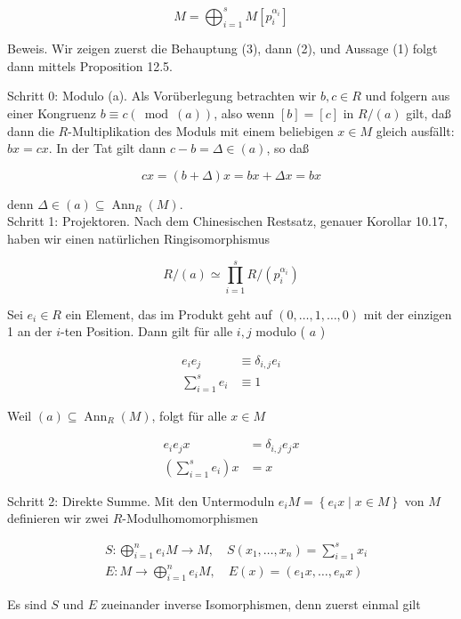 \documentclass[10pt, letterpaper]{article}
\begin{document}
$$
M=\bigoplus_{i=1}^{s} M\left[p_{i}^{\alpha_{i}}\right]
$$

Beweis. Wir zeigen zuerst die Behauptung (3), dann (2), und Aussage (1) folgt dann mittels Proposition 12.5.

Schritt 0: Modulo (a). Als Vorüberlegung betrachten wir $b, c \in R$ und folgern aus einer Kongruenz $b \equiv c(\bmod (a))$, also wenn $[b]=[c]$ in $R /(a)$ gilt, daß dann die $R$-Multiplikation des Moduls mit einem beliebigen $x \in M$ gleich ausfällt: $b x=c x$. In der Tat gilt dann $c-b=\Delta \in(a)$, so daß

$$
c x=(b+\Delta) x=b x+\Delta x=b x
$$

denn $\Delta \in(a) \subseteq \operatorname{Ann}_{R}(M)$.\\
Schritt 1: Projektoren. Nach dem Chinesischen Restsatz, genauer Korollar 10.17, haben wir einen natürlichen Ringisomorphismus

$$
R /(a) \simeq \prod_{i=1}^{s} R /\left(p_{i}^{\alpha_{i}}\right)
$$

Sei $e_{i} \in R$ ein Element, das im Produkt geht auf $(0, \ldots, 1, \ldots, 0)$ mit der einzigen 1 an der $i$-ten Position. Dann gilt für alle $i, j$ modulo ( $a$ )

$$
\begin{aligned}
e_{i} e_{j} & \equiv \delta_{i, j} e_{i} \\
\sum_{i=1}^{s} e_{i} & \equiv 1
\end{aligned}
$$

Weil $(a) \subseteq \operatorname{Ann}_{R}(M)$, folgt für alle $x \in M$

$$
\begin{aligned}
e_{i} e_{j} x & =\delta_{i, j} e_{j} x \\
\left(\sum_{i=1}^{s} e_{i}\right) x & =x
\end{aligned}
$$

Schritt 2: Direkte Summe. Mit den Untermoduln $e_{i} M=\left\{e_{i} x \mid x \in M\right\}$ von $M$ definieren wir zwei $R$-Modulhomomorphismen

$$
\begin{aligned}
& S: \bigoplus_{i=1}^{n} e_{i} M \rightarrow M, \quad S\left(x_{1}, \ldots, x_{n}\right)=\sum_{i=1}^{s} x_{i} \\
& E: M \rightarrow \bigoplus_{i=1}^{n} e_{i} M, \quad E(x)=\left(e_{1} x, \ldots, e_{n} x\right)
\end{aligned}
$$

Es sind $S$ und $E$ zueinander inverse Isomorphismen, denn zuerst einmal gilt
\end{document}
